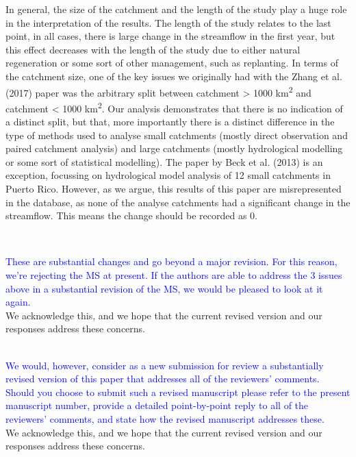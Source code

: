 \documentclass[]{elsarticle} %
\begin{document}
\begin{itemize}
  In general, the size of the catchment and the length of the study play a huge role in the interpretation of the results. The length of the study relates to the last point, in all cases, there is large change in the streamflow in the first year, but this effect decreases with the length of the study due to either natural regeneration or some sort of other management, such as replanting. In terms of the catchment size, one of the key issues we originally had with the Zhang et al. (2017) paper was the arbitrary split between catchment \textgreater{} 1000 km\textsuperscript{2} and catchment \textless{} 1000 km\textsuperscript{2}. Our analysis demonstrates that there is no indication of a distinct split, but that, more importantly there is a distinct difference in the type of methods used to analyse small catchments (mostly direct observation and paired catchment analysis) and large catchments (mostly hydrological modelling or some sort of statistical modelling). The paper by Beck et al. (2013) is an exception, focussing on hydrological model analysis of 12 small catchments in Puerto Rico. However, as we argue, this results of this paper are misrepresented in the database, as none of the analyse catchments had a significant change in the streamflow. This means the change should be recorded as 0.\\
  \strut \\
\end{itemize}

\textcolor{blue}{These are substantial changes and go beyond a major revision.  For this reason, we're rejecting the MS at present.  If the authors are able to address the 3 issues above in a substantial revision of the MS, we would be pleased to look at it again.}\\
We acknowledge this, and we hope that the current revised version and our responses address these concerns.\\
\strut \\
\textcolor{blue}{We would, however, consider as a new submission for review a substantially revised version of this paper that addresses all of the reviewers' comments.  Should you choose to submit such a revised manuscript please refer to the present manuscript number, provide a detailed point-by-point reply to all of the reviewers' comments, and state how the revised manuscript addresses these.}\\
We acknowledge this, and we hope that the current revised version and our responses address these concerns.\\
\end{document}
